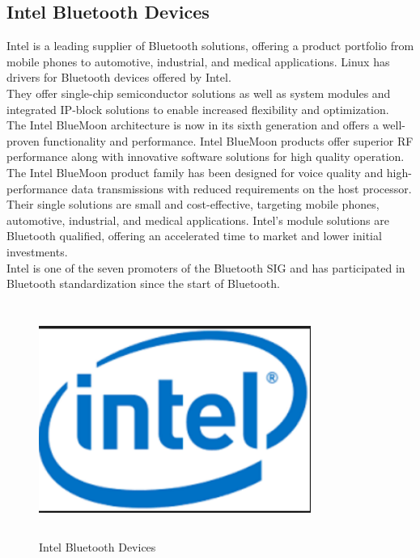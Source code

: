 \subsection{Intel Bluetooth Devices}
Intel is a leading supplier of Bluetooth solutions, offering a product portfolio from mobile phones to automotive, industrial, and medical applications. Linux has drivers for Bluetooth devices offered by Intel.\\
They offer single-chip semiconductor solutions as well as system modules and integrated IP-block solutions to enable increased flexibility and optimization.\\
The Intel BlueMoon architecture is now in its sixth generation and offers a well-proven functionality and performance. Intel BlueMoon products offer superior RF performance along with innovative software solutions for high quality operation. The Intel BlueMoon product family has been designed for voice quality and high-performance data transmissions with reduced requirements on the host processor.\\
Their single solutions are small and cost-effective, targeting mobile phones, automotive, industrial, and medical applications. Intel’s module solutions are Bluetooth qualified, offering an accelerated time to market and lower initial investments.\\
Intel is one of the seven promoters of the Bluetooth SIG and has participated in Bluetooth standardization since the start of Bluetooth.
\begin{figure}[ht]
	\centering
	\includegraphics[width=3.5in, height=3in]{images/intel_bluetooth.png}
	\caption{Intel Bluetooth Devices}
\end{figure}
